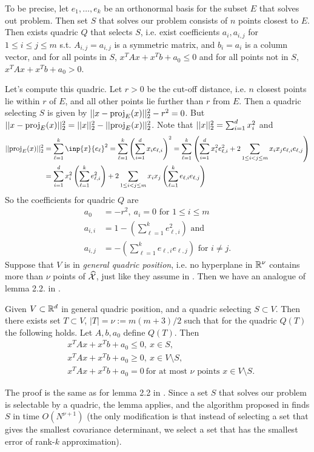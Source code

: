 \documentclass{article}
\begin{document}
To be precise, let $e_1,\dots,e_k$ be an orthonormal basis for the subset $E$ that solves out problem. Then set $S$ that solves our problem consists of $n$ points closest to $E$. Then exists quadric $Q$ that selects $S$, i.e. exist coefficients $a_i, a_{i,j}$ for $1\leq i\leq j\leq m$ s.t. $A_{i,j} = a_{i,j}$ is a symmetric matrix, and $b_i = a_i$ is a column vector, and for all points in $S$, $x^TAx + x^Tb + a_0 \leq 0$ and for all points not in $S$, $x^TAx + x^Tb + a_0 > 0$.

Let's compute this quadric. Let $r>0$ be the cut-off distance, i.e. $n$ closest points lie within $r$ of $E$, and all other points lie further than $r$ from $E$. Then a quadric selecting $S$ is given by $||x - \text{proj}_{E}(x)||_2^2 - r^2 = 0$. But $||x - \text{proj}_{E}(x)||_2^2 = ||x||_2^2 - ||\text{proj}_{E}(x)||_2^2$. Note that $||x||_2^2 = \sum_{i=1}^d x_i^2$ and
\begin{align*}
    \norm{\proj_{E}(x)}_2^2 &= \sum_{\ell=1}^k \inp{x}{e_\ell}^2 = \sum_{\ell=1}^k \left(\sum_{i=1}^d x_i e_{\ell,i}\right)^2 = \sum_{\ell=1}^k \left( \sum_{i=1}^d x_i^2 e_{\ell,i}^2 + 2\sum_{1\leq i < j\leq m} x_ix_j e_{\ell,i}e_{\ell,j} \right)\\
    &= \sum_{i=1}^d x_i^2 \left(\sum_{\ell=1}^k  e_{\ell,i}^2\right) + 2\sum_{1\leq i < j\leq m} x_ix_j \left(\sum_{\ell=1}^k  e_{\ell,i}e_{\ell,j} \right)
\end{align*}
So the coefficients for quadric $Q$ are
\begin{align*}
    a_0 &= -r^2,\ a_i = 0 \text{ for $1\leq i\leq m$}\\
    a_{i,i} &= 1 - \left(\sum_{\ell=1}^k  e_{\ell,i}^2 \right) \text{ and } \\
    a_{i,j} &= - \left(\sum_{\ell=1}^k  e_{\ell,i}e_{\ell,j} \right)\text{ for $i\neq j$}.
\end{align*}
Suppose that $V$ is in \textit{general quadric position}, i.e. no hyperplane in $\mathbb{R}^\nu$ contains more than $\nu$ points of $\widehat{\mathcal{X}}$, just like they assume in \cite{bernholt2004complexity}. Then we have an analogue of lemma 2.2. in \cite{bernholt2004complexity}.
\begin{lemma}
Given $V\subset \mathbb{R}^d$ in general quadric position, and a quadric selecting $S\subset V$. Then there exists set $T \subset V$, $|T| = \nu := m(m+3)/2$ such that for the quadric $Q(T)$ the following holds. Let $A,b,a_0$ define $Q(T)$. Then
\begin{align*}
    & x^TAx + x^Tb + a_0 \leq 0,\ x\in S,\\
    & x^TAx + x^Tb + a_0 \geq 0,\ x\in V\setminus S,\\
    & x^TAx + x^Tb + a_0 = 0\ \text{for at most $\nu$ points $x\in V\setminus S$}.
\end{align*}
\end{lemma}
The proof is the same as for lemma 2.2 in \cite{bernholt2004complexity}. Since a set $S$ that solves our problem is selectable by a quadric, the lemma applies, and the algorithm proposed in \cite{bernholt2004complexity} finds $S$ in time $O(N^{\nu+1})$ (the only modification is that instead of selecting a set that gives the smallest covariance determinant, we select a set that has the smallest error of rank-$k$ approximation).
\end{document}
